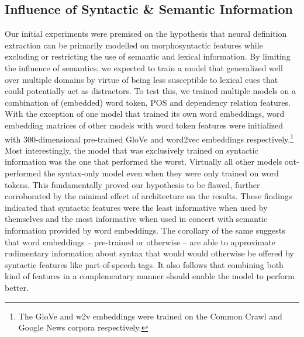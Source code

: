 \documentclass[11pt]{article}
\begin{document}
\subsection{Influence of Syntactic \& Semantic Information}
Our initial experiments were premised on the hypothesis that neural definition extraction can be primarily modelled on
morphosyntactic features while excluding or restricting the use of semantic and lexical information. By limiting the influence
of semantics, we expected to train a model that generalized well over multiple domains by virtue of being less susceptible to
lexical cues that could potentially act as distractors. To test this, we trained multiple models on a combination of (embedded) word token,
POS and dependency relation features. With the exception of one model that trained its own word embeddings, word embedding matrices of
other models with word token features were initialized with 300-dimensional pre-trained GloVe \cite{pennington2014glove} and word2vec
\cite{mikolov2013efficient} embeddings respectively.\footnote{The GloVe and w2v embeddings were trained on the Common Crawl
and Google News corpora respectively.}\\

Most interestingly, the model that was exclusively trained on syntactic information was the one that performed the worst. Virtually all
other models out-performed the syntax-only model even when they were only trained on word tokens. This fundamentally proved our hypothesis
to be flawed, further corroborated by the minimal effect of architecture on the results. These findings indicated that syntactic features
were the least informative when used by themselves and the most informative when used in concert with semantic information provided by word
embeddings. The corollary of the same suggests that word embeddings -- pre-trained or otherwise -- are able to approximate rudimentary
information about syntax that would would otherwise be offered by syntactic features like part-of-speech tags. It also follows that
combining both kind of features in a complementary manner should enable the model to perform better.
\end{document}
